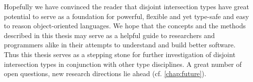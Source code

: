 Hopefully we have convinced the reader that disjoint intersection types have
great potential to serve as a foundation for powerful, flexible and yet
type-safe and easy to reason object-oriented languages. We hope that the
concepts and the methods described in this thesis may serve as a helpful guide
to researchers and programmers alike in their attempts to understand and build
better software. Thus this thesis serves as a stepping stone for further
investigation of disjoint intersection types in conjunction with other type
disciplines. A great number of open questions, new research directions lie ahead
(cf. \cref{chap:future}).



